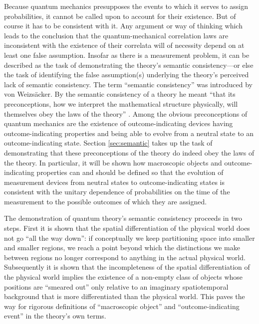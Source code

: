 Because quantum mechanics presupposes the events to which it serves to assign probabilities, it cannot be called upon to account for their existence. But of course it has to be consistent with it. Any argument or way of thinking which leads to the conclusion that the quantum-mechanical correlation laws are inconsistent with the existence of their correlata will of necessity depend on at least one false assumption. Insofar as there is a measurement problem, it can be described as the task of demonstrating the theory's semantic consistency---or else the task of identifying the false assumption(s) underlying the theory's perceived lack of semantic consistency. The term ``semantic consistency'' was introduced by von Weizs\"acker. By the semantic consistency of a theory he meant ``that its preconceptions, how we interpret the mathematical structure physically, will themselves obey the laws of the theory'' \citep[p.~260]{vW}. Among the obvious preconceptions of quantum mechanics are the existence of outcome-indicating devices having outcome-indicating properties and being able to evolve from a neutral state to an outcome-indicating state. Section \ref{sec:semantic} takes up the task of demonstrating that these preconceptions of the theory do indeed obey the laws of the theory. In particular, it will be shown how macroscopic objects and outcome-indicating properties can and should be defined so that the evolution of measurement devices from neutral states to outcome-indicating states is consistent with the unitary dependence of probabilities on the time of the measurement to the possible outcomes of which they are assigned.

The demonstration of quantum theory's semantic consistency proceeds in two steps. First it is shown  that the spatial differentiation of the physical world does not go ``all the way down'': if conceptually we keep partitioning space into smaller and smaller regions, we reach a point beyond which the distinctions we make between regions no longer correspond to anything in the actual physical world. Subsequently it is shown that the incompleteness of the spatial differentiation of the physical world implies the existence of a non-empty class of objects whose positions are ``smeared out'' only relative to an imaginary spatiotemporal background that is more differentiated than the physical world. This paves the way for rigorous definitions of ``macroscopic object'' and ``outcome-indicating event'' in the theory's own terms.

